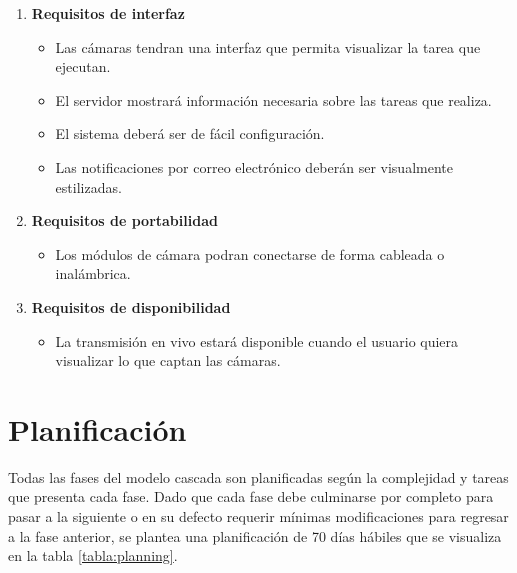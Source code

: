 \begin{itemize}
    \begin{enumerate}
        \item  \textbf{Requisitos de interfaz} 
            \begin{itemize}
                \item Las cámaras tendran una interfaz que permita visualizar la tarea que ejecutan.
                \item El servidor mostrará información necesaria sobre las tareas que realiza.
                \item El sistema deberá ser de fácil configuración.
                \item Las notificaciones por correo electrónico deberán ser visualmente estilizadas.
            \end{itemize}
        \item \textbf{Requisitos de portabilidad}
            \begin{itemize}
                \item Los módulos de cámara podran conectarse de forma cableada o inalámbrica.
            \end{itemize}
        \item \textbf{Requisitos de disponibilidad}
            \begin{itemize}
                \item La transmisión en vivo estará disponible cuando el usuario quiera visualizar lo que captan las cámaras.
            \end{itemize}
    \end{enumerate}

\end{itemize}

\section{Planificación}
Todas las fases del modelo cascada son planificadas según la complejidad y tareas que presenta cada fase. Dado que cada fase debe culminarse por completo para pasar a la siguiente o en su defecto requerir mínimas modificaciones para regresar a la fase anterior, se plantea una planificación de 70 días hábiles que se visualiza en la tabla \ref{tabla:planning}.\\

